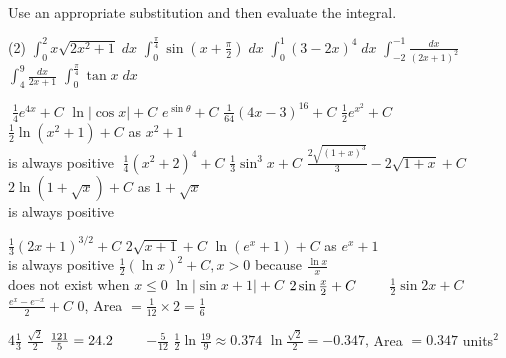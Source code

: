 \begin{Exercise}[title={Integration by Substitution},label=exIBS]
\Question Use an appropriate substitution and then evaluate the integral.
	\begin{tasks}(2)
	\task  $\int _{0}^{2}x \sqrt{2 x^{2} +1}\; d x$ %
	\task $\int _{0}^{\frac{\pi }{4}}\sin  \left (x +\frac{\pi }{2}\right )\; d x$ %
	\task $\int _{0}^{1}\left (3 -2 x\right )^{4}\; d x$ %
	\task $\int _{ -2}^{ -1}\frac{d x}{\left (2 x +1\right )^{2}}$ %
	\task $\int _{4}^{9}\frac{d x}{2 x +1}$ %
	\task $\int _{0}^{\frac{\pi }{4}}\tan  x\; d x$ %
\end{tasks}
\end{Exercise}
\begin{Answer}[ref={exIBS}]

\Question %
\begin{tasks}
	\task  $\;\frac{1}{4} e^{4 x} +C$ 
	\task $\ln  \left \vert \cos  x\right \vert  +C$ 
	\task $e^{\sin  \theta } +C$ 
	\task $\frac{1}{64} \left (4 x -3\right )^{16} +C$ 
	\task $\frac{1}{2} e^{x^{2}} +C$ 
	\task $\frac{1}{2} \ln  \left (x^{2} +1\right ) +C$ as $x^{2} +1$ \\is always positive 
	\task $\;\frac{1}{4} \left (x^{2} +2\right )^{4} +C$
	\task $\frac{1}{3} \sin ^{3} x +C$ 
	\task $\frac{2 \sqrt{\left (1 +x\right )^{3}}}{3} -2 \sqrt{1 +x} +C$ 
	\task $2 \ln  \left (1 +\sqrt{x}\right ) +C$ as $1 +\sqrt{x}$ \\is always positive 
\end{tasks}

\Question %
\begin{tasks}
	\task $\frac{1}{3} \left (2 x +1\right )^{3/2} +C$ 
	\task $2 \sqrt{x +1} +C$ 
	\task $\ln  \left (e^{x} +1\right ) +C$ as $e^{x} +1$ \\is always positive 
	\task $\frac{1}{2} \left (\ln  x\right )^{2} +C ,x >0$ because $\frac{\ln  x}{x}$ \\
	does not exist when $x \leq 0$ 
	\task $\ln  \left \vert \sin  x +1\right \vert  +C$
	\task $2 \sin  \frac{x}{2} +C\text{\quad \quad }$
	\task $\frac{1}{2} \sin  2 x +C$ 
	\task $\frac{e^{x} -e^{ -x}}{2} +C$
	\task $0$, Area $ =\frac{1}{12} \times 2 =\frac{1}{6}$
\end{tasks}

\Question %
\begin{tasks}
	\task $4\frac{1}{3}$
	\task $\frac{\sqrt{2}}{2}$ 
	\task $\frac{121}{5} =24.2\text{\quad \quad }$
	\task $ -\frac{5}{12}$ 
	\task $\frac{1}{2} \ln  \frac{19}{9} \approx 0.374$ 
	\task $\ln  \frac{\sqrt{2}}{2} = -0.347\text{,}$ Area $ =0.347$ units$^2$
\end{tasks}
\end{Answer}%

